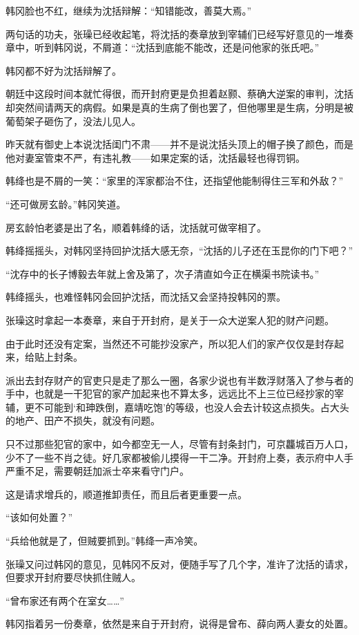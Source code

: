 韩冈脸也不红，继续为沈括辩解：“知错能改，善莫大焉。”

两句话的功夫，张璪已经收起笔，将沈括的奏章放到宰辅们已经写好意见的一堆奏章中，听到韩冈说，不屑道：“沈括到底能不能改，还是问他家的张氏吧。”

韩冈都不好为沈括辩解了。

朝廷中这段时间本就忙得很，而开封府更是负担着赵颢、蔡确大逆案的审判，沈括却突然间请两天的病假。如果是真的生病了倒也罢了，但他哪里是生病，分明是被葡萄架子砸伤了，没法儿见人。

昨天就有御史上本说沈括闺门不肃——并不是说沈括头顶上的帽子换了颜色，而是他对妻室管束不严，有违礼教——如果定案的话，沈括最轻也得罚铜。

韩绛也是不屑的一笑：“家里的浑家都治不住，还指望他能制得住三军和外敌？”

“还可做房玄龄。”韩冈笑道。

房玄龄怕老婆是出了名，顺着韩绛的话，沈括就可做宰相了。

韩绛摇摇头，对韩冈坚持回护沈括大感无奈，“沈括的儿子还在玉昆你的门下吧？”

“沈存中的长子博毅去年就上舍及第了，次子清直如今正在横渠书院读书。”

韩绛摇头，也难怪韩冈会回护沈括，而沈括又会坚持投韩冈的票。

张璪这时拿起一本奏章，来自于开封府，是关于一众大逆案人犯的财产问题。

由于此时还没有定案，当然还不可能抄没家产，所以犯人们的家产仅仅是封存起来，给贴上封条。

派出去封存财产的官吏只是走了那么一圈，各家少说也有半数浮财落入了参与者的手中，也就是一干犯官的家产加起来也不算太多，远远比不上三位已经抄家的宰辅，更不可能到‘和珅跌倒，嘉靖吃饱’的等级，也没人会去计较这点损失。占大头的地产、田产不损失，就没有问题。

只不过那些犯官的家中，如今都空无一人，尽管有封条封门，可京龘城百万人口，少不了一些不肖之徒。好几家都被偷儿摸得一干二净。开封府上奏，表示府中人手严重不足，需要朝廷加派士卒来看守门户。

这是请求增兵的，顺道推卸责任，而且后者更重要一点。

“该如何处置？”

“兵给他就是了，但贼要抓到。”韩绛一声冷笑。

张璪又问过韩冈的意见，见韩冈不反对，便随手写了几个字，准许了沈括的请求，但要求开封府要尽快抓住贼人。

“曾布家还有两个在室女……”

韩冈指着另一份奏章，依然是来自于开封府，说得是曾布、薛向两人妻女的处置。

